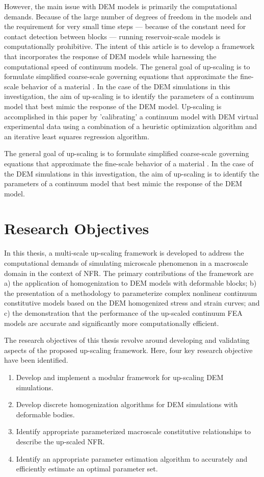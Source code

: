 However, the main issue with DEM models is primarily the computational demands. Because of the large number of degrees of freedom in the models and the requirement for very small time steps --- because of the constant need for contact detection between blocks --- running reservoir-scale models is computationally prohibitive. The intent of this article is to develop a framework that incorporates the response of DEM models while harnessing the computational speed of continuum models. The general goal of up-scaling is to formulate simplified coarse-scale governing equations that approximate the fine-scale behavior of a material \citep{Geers_2010}. In the case of the DEM simulations in this investigation, the aim of up-scaling is to identify the parameters of a continuum model that best mimic the response of the DEM model.  Up-scaling is accomplished in this paper by 'calibrating' a continuum model with DEM virtual experimental data using a combination of a heuristic optimization algorithm and an iterative least squares regression algorithm.

The general goal of up-scaling is to formulate simplified coarse-scale governing equations that approximate the fine-scale behavior of a material \citep{Geers_2010}. In the case of the DEM simulations in this investigation, the aim of up-scaling is to identify the parameters of a continuum model that best mimic the response of the DEM model.

\section{Research Objectives}

In this thesis, a multi-scale up-scaling framework is developed to address the computational demands of simulating microscale phenomenon in a macroscale domain in the context of NFR. The primary contributions of the framework are a) the application of homogenization to DEM models with deformable blocks; b) the presentation of a methodology to parameterize complex nonlinear continuum constitutive models based on the DEM homogenized stress and strain curves; and c) the demonstration that the performance of the up-scaled continuum FEA models are accurate and significantly more computationally efficient.

The research objectives of this thesis revolve around developing and validating aspects of the proposed up-scaling framework. Here, four key research objective have been identified.  

\begin{enumerate}
\item Develop and implement a modular framework for up-scaling DEM simulations.
\item Develop discrete homogenization algorithms for DEM simulations with deformable bodies.
\item Identify appropriate parameterized macroscale constitutive relationships to describe the up-scaled NFR.
\item Identify an appropriate parameter estimation algorithm to accurately and efficiently estimate an optimal parameter set.
\end{enumerate}

